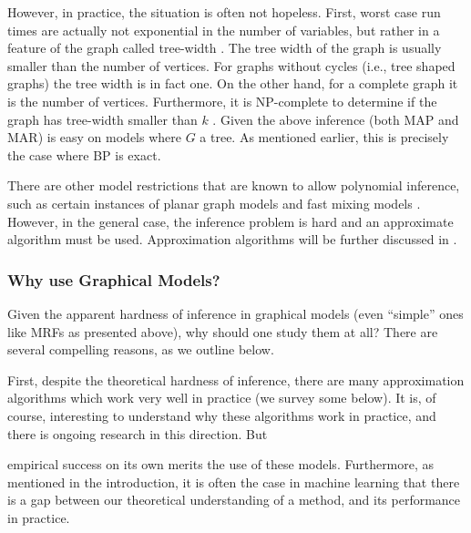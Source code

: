 However, in practice, the situation is often not hopeless. First, worst case run times are actually not exponential in the number of variables, but rather in a feature of the graph called tree-width  \cite{robertson1983graph,robertson1994quickly}.
The tree width of the graph is usually smaller than the number of vertices. For graphs without cycles (i.e., tree shaped graphs) the tree width is in fact one. On the other hand, for a complete graph it is the number of vertices. Furthermore, it is NP-complete to determine if the graph has tree-width smaller than $k$  \cite{Arnborg:1987}.
Given the above inference (both MAP and MAR) is easy on models where $G$ a tree. As mentioned earlier, this is precisely the case where BP is exact.

There are other model restrictions that are known to allow polynomial
inference, such as certain instances of planar graph models  \cite{jaakkola2007approximate} and
fast mixing models  \cite{jerrum1993polynomial}.  However, in the
general case, the inference problem is hard and an approximate
algorithm must be used. Approximation algorithms will be further discussed in
.

\subsubsection{Why use Graphical Models?}
 
Given the apparent hardness of inference in graphical models (even ``simple'' ones like MRFs as presented above), why should
one study them at all? There are several compelling reasons, as we outline below.

First, despite the theoretical hardness of inference, there are many approximation algorithms which work very well in practice (we survey some below). It is, of course, interesting to understand why these algorithms work in practice, and there is ongoing research in this direction.
But  empirical success on its own merits the use of these models. Furthermore, as mentioned in the introduction, it is often the case in machine learning that there is a gap between our theoretical understanding of a method, and its performance in practice.

